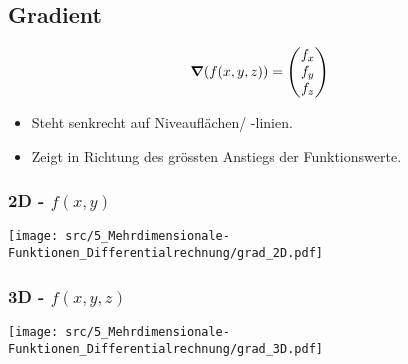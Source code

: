 \subsection{Gradient}
    $$
        \grad(f(x,y,z)) = \begin{pmatrix}
            f_x \\ f_y \\ f_z
        \end{pmatrix}
    $$
    \begin{itemize}
        \item Steht senkrecht auf Niveauflächen/ -linien.
        \item Zeigt in Richtung des grössten Anstiegs der Funktionswerte.
    \end{itemize}
    \subsubsection{2D - $f(x,y)$}
        \texttt{[image: src/5\_Mehrdimensionale-Funktionen\_Differentialrechnung/grad\_2D.pdf]}
    \subsubsection{3D - $f(x,y,z)$}
        \begin{center}
            \texttt{[image: src/5\_Mehrdimensionale-Funktionen\_Differentialrechnung/grad\_3D.pdf]}
        \end{center}